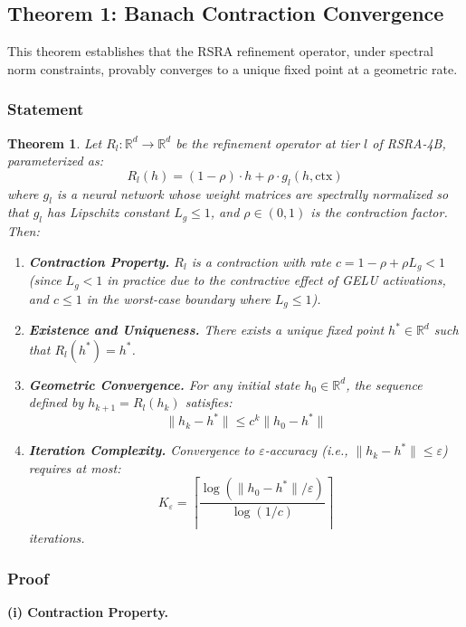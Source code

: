 \documentclass[11pt,a4paper]{article}
\newtheorem{theorem}{Theorem}
\theoremstyle{definition}
\begin{document}
\subsection{Theorem 1: Banach Contraction Convergence}

This theorem establishes that the RSRA refinement operator, under spectral norm constraints, provably converges to a unique fixed point at a geometric rate.

\subsubsection{Statement}

\begin{theorem}
Let $R_l : \mathbb{R}^d \to \mathbb{R}^d$ be the refinement operator at tier $l$ of RSRA-4B, parameterized as:
\[ R_l(h) = (1 - \rho) \cdot h + \rho \cdot g_l(h, \mathrm{ctx}) \]
where $g_l$ is a neural network whose weight matrices are spectrally normalized so that $g_l$ has Lipschitz constant $L_g \leq 1$, and $\rho \in (0, 1)$ is the contraction factor. Then:
\begin{enumerate}
    \item \textbf{Contraction Property.} $R_l$ is a contraction with rate $c = 1 - \rho + \rho L_g < 1$ (since $L_g < 1$ in practice due to the contractive effect of GELU activations, and $c \leq 1$ in the worst-case boundary where $L_g \leq 1$).
    \item \textbf{Existence and Uniqueness.} There exists a unique fixed point $h^* \in \mathbb{R}^d$ such that $R_l(h^*) = h^*$.
    \item \textbf{Geometric Convergence.} For any initial state $h_0 \in \mathbb{R}^d$, the sequence defined by $h_{k+1} = R_l(h_k)$ satisfies:
    \[ \|h_k - h^*\| \leq c^k \|h_0 - h^*\| \]
    \item \textbf{Iteration Complexity.} Convergence to $\varepsilon$-accuracy (i.e., $\|h_k - h^*\| \leq \varepsilon$) requires at most:
    \[ K_\varepsilon = \left\lceil \frac{\log(\|h_0 - h^*\| / \varepsilon)}{\log(1/c)} \right\rceil \]
    iterations.
\end{enumerate}
\end{theorem}

\subsubsection{Proof}

\noindent\textbf{(i) Contraction Property.}
\end{document}
